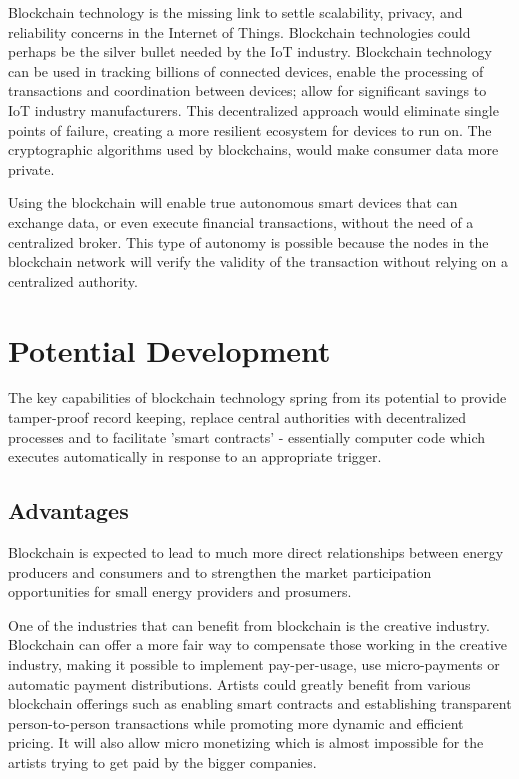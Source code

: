 \documentclass[a4paper]{article}
\begin{document}
	Blockchain technology is the missing link to settle scalability, privacy, and reliability concerns in the Internet of Things. Blockchain technologies could perhaps be the silver bullet needed by the IoT industry. Blockchain technology can be used in tracking billions of connected devices, enable the processing of transactions and coordination between devices; allow for significant savings to IoT industry manufacturers. This decentralized approach would eliminate single points of failure, creating a more resilient ecosystem for devices to run on. The cryptographic algorithms used by blockchains, would make consumer data more private.
	
	Using the blockchain will enable true autonomous smart devices that can exchange data, or even execute financial transactions, without the need of a centralized broker. This type of autonomy is possible because the nodes in the blockchain network will verify the validity of the transaction without relying on a centralized authority.
	
	\section{Potential Development}
	The key capabilities of blockchain technology spring from its potential to provide tamper-proof record keeping, replace central authorities with decentralized processes and to facilitate 'smart contracts' - essentially computer code which executes automatically in response to an appropriate trigger.
	
	\subsection{Advantages}
	Blockchain is expected to lead to much more direct relationships between energy producers and consumers and to strengthen the market participation opportunities for small energy providers and prosumers. 
	
	One of the industries that can benefit from blockchain is the creative industry. Blockchain can offer a more fair way to compensate those working in the creative industry, making it possible to implement pay-per-usage, use micro-payments or automatic payment distributions. Artists could greatly benefit from various blockchain offerings such as enabling smart contracts and establishing transparent person-to-person transactions while promoting more dynamic and efficient pricing. It will also allow micro monetizing which is almost impossible for the artists trying to get paid by the bigger companies.
	
\end{document}
